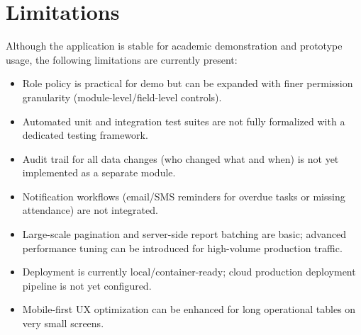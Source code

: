 \chapter{Limitations}

Although the application is stable for academic demonstration and prototype usage, the following limitations are currently present:

\begin{itemize}[leftmargin=1.3cm]
\item Role policy is practical for demo but can be expanded with finer permission granularity (module-level/field-level controls).
\item Automated unit and integration test suites are not fully formalized with a dedicated testing framework.
\item Audit trail for all data changes (who changed what and when) is not yet implemented as a separate module.
\item Notification workflows (email/SMS reminders for overdue tasks or missing attendance) are not integrated.
\item Large-scale pagination and server-side report batching are basic; advanced performance tuning can be introduced for high-volume production traffic.
\item Deployment is currently local/container-ready; cloud production deployment pipeline is not yet configured.
\item Mobile-first UX optimization can be enhanced for long operational tables on very small screens.
\end{itemize}
